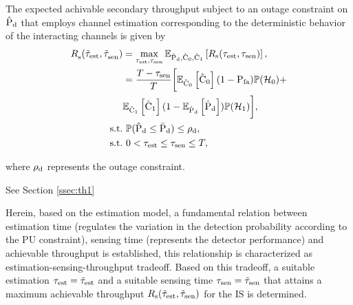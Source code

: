 \begin{theorem} \label{th_IS:th2}
\normalfont
The expected achivable secondary throughput subject to an outage constraint on $\hat{\text{P}}_{\text{d}}$ that employs channel estimation corresponding to the deterministic behavior of the interacting channels is given by  
\begin{align}
{R}_{\text{s}}^{\text{}}(\tilde{\tau}_{\text{est}}, \tilde{\tau}_{\text{sen}}^{\text{}}) &= \operatorname*{max}_{\tau_{\text{est}}, \tau_{\text{sen}}} {\mathbb E}_{\hat{\text{P}}_{\text{d}}, \hat{\text{C}}_{\text{0}}, \hat{\text{C}}_{\text{1}}}\left[ R_{\text{s}}(\tau_{\text{est}}, \tau_{\text{sen}}) \right], \nonumber \\ 
\quad &= \frac{T- \tau_{\text{sen}}}{T} \bigg[ {\mathbb E}_{\hat{\text{C}}_{\text{0}}}\left[ \hat{\text{C}}_{\text{0}} \right] (1 - \text{P}_{\text{fa}}) \mathbb P(\mathcal{H}_0) + \nonumber \\ \quad & {\mathbb E}_{\hat{\text{C}}_{\text{1}}}\left[ \hat{\text{C}}_{\text{1}} \right] (1 - {\mathbb E}_{\hat{\text{P}}_{\text{d}}}\left[ \hat{\text{P}}_{\text{d}} \right]) \mathbb P(\mathcal{H}_1)  \bigg], \label{eq_IS:thr_OC} \\
\text{s.t.} & \text{ }  \mathbb P(\hat{\text{P}}_{\text{d}} \le \bar{\text{P}}_{\text{d}}) \le \rho_{\text{d}}, \label{eq_IS:OC} \\
\text{s.t.} & \text{ }  0 < \tau_{\text{est}} \le \tau_{\text{sen}} \le T, \nonumber
\end{align}
\end{theorem} 
where $\rho_{\text{d}}$ represents the outage constraint. 

\begin{IEEEproof} 
See Section \ref{ssec:th1}
\end{IEEEproof} 


\begin{remark} \label{rem_IS:rem1}
\normalfont
Herein, based on the estimation model, a fundamental relation between estimation time (regulates the variation in the detection probability according to the PU constraint), sensing time (represents the detector performance) and achievable throughput is established, this relationship is characterized as estimation-sensing-throughput tradeoff. Based on this tradeoff, a suitable estimation $\tau_{\text{est}} = \tilde{\tau}_{\text{est}}$ and a suitable sensing time $\tau_{\text{sen}} = \tilde{\tau}_{\text{sen}}$ that attains a maximum achievable throughput $R_{\text{s}}(\tilde{\tau}_{\text{est}},\tilde{\tau}_{\text{sen}})$ for the IS is determined.  
\end{remark}

